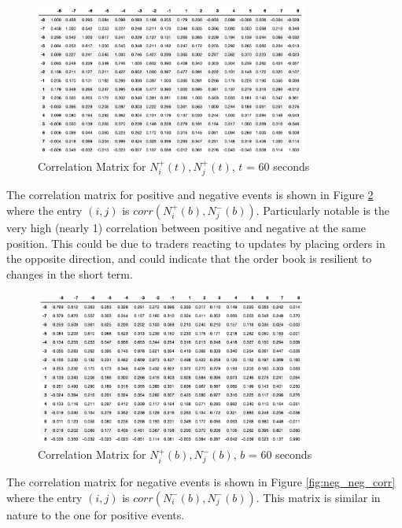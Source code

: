 \begin{figure}[t]
\begin{center}
\includegraphics[width=0.8\textwidth]{Figures/pos_pos.png}
\caption{Correlation Matrix for $N^{+}_i(t), N^{+}_j(t)$, $t$ = 60 seconds}
\label{fig:pos_pos_corr}
\end{center}
\end{figure}

The correlation matrix for positive and negative events is shown in Figure \ref{fig:pos_neg_corr} where the entry $(i,j)$ is $corr(N^{+}_i(b), N^{-}_j(b))$. Particularly notable is the very high (nearly 1) correlation between positive and negative at the same position. This could be due to traders reacting to updates by placing orders in the opposite direction, and could indicate that the order book is resilient to changes in the short term.

\begin{figure}[t]
\begin{center}
\includegraphics[width=0.8\textwidth]{Figures/pos_neg.png}
\caption{Correlation Matrix for $N^{+}_i(b), N^{-}_j(b)$, $b$ = 60 seconds}
\label{fig:pos_neg_corr}
\end{center}
\end{figure}

The correlation matrix for negative events is shown in Figure \ref{fig:neg_neg_corr} where the entry $(i,j)$ is $corr(N^{-}_i(b), N^{-}_j(b))$. This matrix is similar in nature to the one for positive events. 

